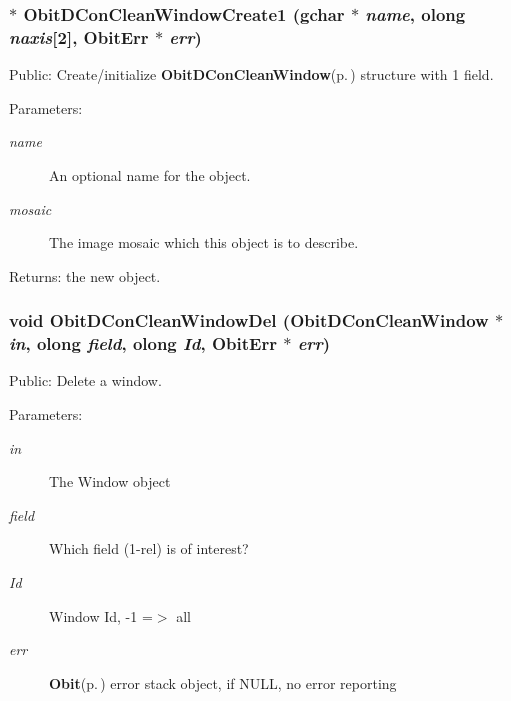 \subsubsection{$\ast$ Obit\-DCon\-Clean\-Window\-Create1 (gchar $\ast$ {\em name}, {\bf olong} {\em naxis}[2], {\bf Obit\-Err} $\ast$ {\em err})}\label{ObitDConCleanWindow_8h_a28}


Public: Create/initialize {\bf Obit\-DCon\-Clean\-Window}{\rm (p.\,\pageref{structObitDConCleanWindow})} structure with 1 field. 

\begin{Desc}
\item[Parameters:]
\begin{description}
\item[{\em name}]An optional name for the object. \item[{\em mosaic}]The image mosaic which this object is to describe. \end{description}
\end{Desc}
\begin{Desc}
\item[Returns:]the new object. \end{Desc}
\subsubsection{\setlength{\rightskip}{0pt plus 5cm}void Obit\-DCon\-Clean\-Window\-Del ({\bf Obit\-DCon\-Clean\-Window} $\ast$ {\em in}, {\bf olong} {\em field}, {\bf olong} {\em Id}, {\bf Obit\-Err} $\ast$ {\em err})}\label{ObitDConCleanWindow_8h_a35}


Public: Delete a window. 

\begin{Desc}
\item[Parameters:]
\begin{description}
\item[{\em in}]The Window object \item[{\em field}]Which field (1-rel) is of interest? \item[{\em Id}]Window Id, -1 =$>$ all \item[{\em err}]{\bf Obit}{\rm (p.\,\pageref{structObit})} error stack object, if NULL, no error reporting \end{description}
\end{Desc}
